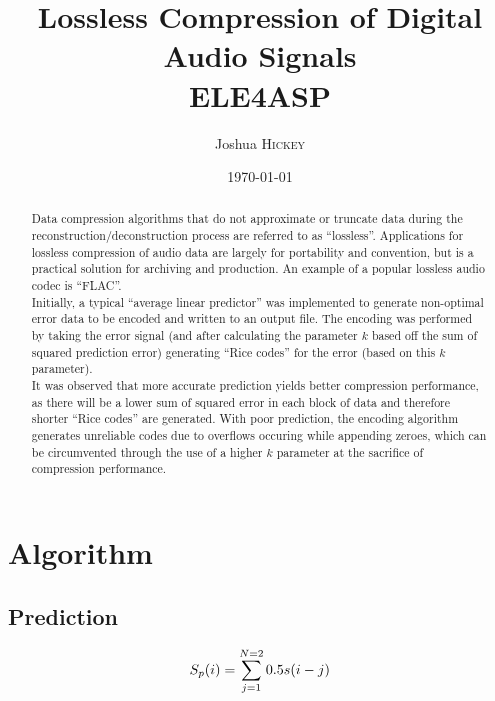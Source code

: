 \documentclass{article}
\title{Lossless Compression of Digital Audio Signals \\ ELE4ASP} %
\author{Joshua \textsc{Hickey}} %
\date{\today} %
\begin{document}
\maketitle %



\begin{abstract}

Data compression algorithms that do not approximate or truncate data during the reconstruction/deconstruction process are referred to as ``lossless''. Applications for lossless compression of audio data are largely for portability and convention, but is a practical solution for archiving and production. An example of a popular lossless audio codec is ``FLAC''.\\

Initially, a typical ``average linear predictor'' was implemented to generate non-optimal error data to be encoded and written to an output file. The encoding was performed by taking the error signal (and after calculating the parameter $k$ based off the sum of squared prediction error) generating ``Rice codes'' for the error (based on this $k$ parameter).\\

It was observed that more accurate prediction yields better compression performance, as there will be a lower sum of squared error in each block of data and therefore shorter ``Rice codes'' are generated. With poor prediction, the encoding algorithm generates unreliable codes due to overflows occuring while appending zeroes, which can be circumvented through the use of a higher $k$ parameter at the sacrifice of compression performance.\\

\end{abstract}

\section*{Algorithm}

\subsection*{Prediction}
\cite{makhoul1975linear}
\begin{equation}
S_p(i) = \sum_{j=1}^{N=2} 0.5s(i-j) \\
\end{equation}
\end{document}
